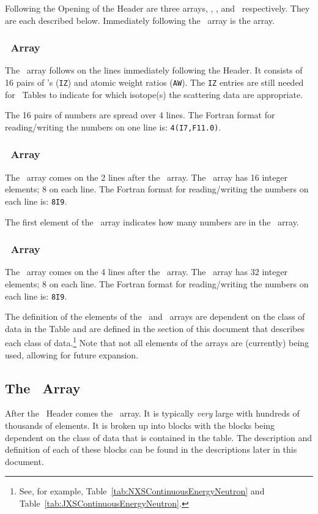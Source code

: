 Following the Opening of the Header are three arrays, \IZAW, \NXS, and \JXS\ respectively. They are each described below. Immediately following the \JXS\ array is the \XSS array.

\subsubsection{\IZAW\ Array}
The \IZAW\ array follows on the lines immediately following the Header. It consists of \num{16} pairs of \ZA's (\texttt{IZ}) and atomic weight ratios (\texttt{AW}). The \texttt{IZ} entries are still needed for \SaB\ Tables to indicate for which isotope(s) the scattering data are appropriate.

The \num{16} pairs of numbers are spread over \num{4} lines. The Fortran format for reading/writing the numbers on one line is: \texttt{4(I7,F11.0)}.

\subsubsection{\NXS\ Array}
The \NXS\ array comes on the \num{2} lines after the \IZAW\ array. The \NXS\ array has \num{16} integer elements; \num{8} on each line. The Fortran format for reading/writing the numbers on each line is: \texttt{8I9}.

The first element of the \NXS\ array indicates how many numbers are in the \XSS\ array. 

\subsubsection{\JXS\ Array}
The \JXS\ array comes on the \num{4} lines after the \NXS\ array. The \JXS\ array has \num{32} integer elements; \num{8} on each line. The Fortran format for reading/writing the numbers on each line is: \texttt{8I9}.

The definition of the elements of the \NXS\ and \JXS\ arrays are dependent on the class of data in the Table and are defined in the section of this document that describes each class of data.\footnote{See, for example, Table~\ref{tab:NXSContinuousEnergyNeutron} and Table~\ref{tab:JXSContinuousEnergyNeutron}.} Note that not all elements of the arrays are (currently) being used, allowing for future expansion.

\subsection{The \XSS\ Array}
After the \ACE\ Header comes the \XSS\ array. It is typically \emph{very} large with hundreds of thousands of elements. It is broken up into blocks with the blocks being dependent on the class of data that is contained in the table. The description and definition of each of these blocks can be found in the descriptions later in this document.

